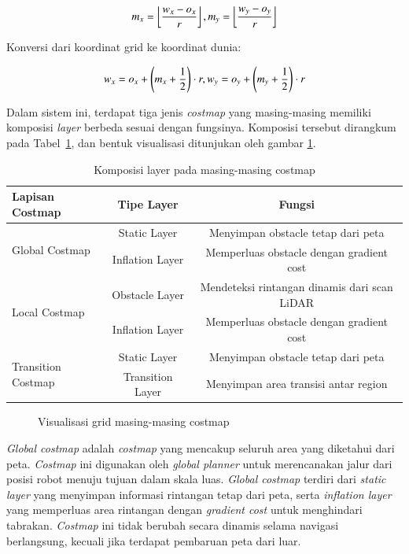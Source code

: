 \begin{equation}
\label{eq:worldtogrid}
m_x = \left\lfloor \frac{w_x - o_x}{r} \right\rfloor, \hfill
m_y = \left\lfloor \frac{w_y - o_y}{r} \right\rfloor
\end{equation}

Konversi dari koordinat grid ke koordinat dunia:

\begin{equation}
w_x = o_x + \left(m_x + \frac{1}{2}\right) \cdot r, \hfill
w_y = o_y + \left(m_y + \frac{1}{2}\right) \cdot r
\end{equation}

Dalam sistem ini, terdapat tiga jenis \emph{costmap} yang masing-masing
memiliki komposisi \emph{layer} berbeda sesuai dengan fungsinya.
Komposisi tersebut dirangkum pada Tabel~\ref{tab:costmap_layers}, dan bentuk visualisasi ditunjukan oleh gambar \ref{fig:costmap_layers}.

\begin{table}[H]
\centering
\caption{Komposisi layer pada masing-masing costmap}
\label{tab:costmap_layers}
\begin{tabular}{lcc}
\toprule
\textbf{Lapisan Costmap} & \textbf{Tipe Layer} & \textbf{Fungsi} \\
\midrule
\multirow{2}{*}{Global Costmap}
 & Static Layer & Menyimpan obstacle tetap dari peta \\
 & Inflation Layer & Memperluas obstacle dengan gradient cost \\
\cmidrule{2-3}
\multirow{2}{*}{Local Costmap}
 & Obstacle Layer & Mendeteksi rintangan dinamis dari scan LiDAR \\
 & Inflation Layer & Memperluas obstacle dengan gradient cost \\
\cmidrule{2-3}
\multirow{2}{*}{Transition Costmap}
 & Static Layer & Menyimpan obstacle tetap dari peta \\
 & Transition Layer & Menyimpan area transisi antar region \\
\bottomrule
\end{tabular}
\end{table}

\begin{figure}[H]
\centering

\caption{Visualisasi grid masing-masing costmap}
\label{fig:costmap_layers}
\end{figure}

\emph{Global costmap} adalah \emph{costmap} yang mencakup seluruh area
yang diketahui dari peta. \emph{Costmap} ini digunakan oleh \emph{global
planner} untuk merencanakan jalur dari posisi robot menuju tujuan dalam
skala luas. \emph{Global costmap} terdiri dari \emph{static layer} yang
menyimpan informasi rintangan tetap dari peta, serta \emph{inflation
layer} yang memperluas area rintangan dengan \emph{gradient cost} untuk
menghindari tabrakan. \emph{Costmap} ini tidak berubah secara dinamis
selama navigasi berlangsung, kecuali jika terdapat pembaruan peta dari
luar.

